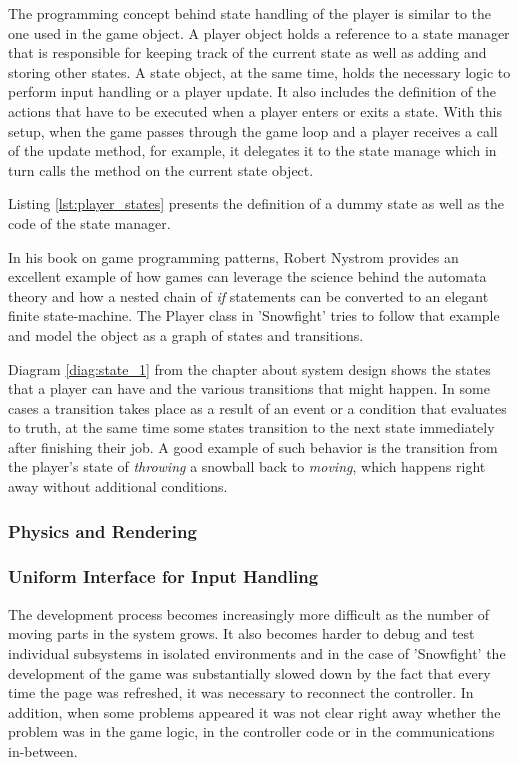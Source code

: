 The programming concept behind state handling of the player is similar to the
one used in the game object. A player object holds a reference to a state
manager that is responsible for keeping track of the current state as well as
adding and storing other states. A state object, at the same time, holds the
necessary logic to perform input handling or a player update. It also includes
the definition of the actions that have to be executed when a player enters or
exits a state. With this setup, when the game passes through the game loop and
a player receives a call of the update method, for example, it delegates it to
the state manage which in turn calls the method on the current state object.

Listing \ref{lst:player_states} presents the definition of a
dummy state as well as the code of the state manager.



In his book on game programming patterns\cite{game_patterns}, Robert Nystrom
provides an excellent example of how games can leverage the science behind the
automata theory and how a nested chain of \emph{if} statements can be converted
to an elegant finite state-machine. The Player class in 'Snowfight' tries to
follow that example and model the object as a graph of states and transitions.

Diagram \ref{diag:state_1} from the chapter about system design shows the states
that a player can have and the various transitions that might happen. In some
cases a transition takes place as a result of an event or a condition that
evaluates to truth, at the same time some states transition to the next state
immediately after finishing their job. A good example of such behavior is the
transition from the player's state of \emph{throwing} a snowball back to
\emph{moving}, which happens right away without additional conditions.

\subsubsection{Physics and Rendering}

\subsubsection{Uniform Interface for Input Handling}

The development process becomes increasingly more difficult as the number of
moving parts in the system grows. It also becomes harder to debug and test
individual subsystems in isolated environments and in the case of 'Snowfight'
the development of the game was substantially slowed down by the fact that every
time the page was refreshed, it was necessary to reconnect the controller. In
addition, when some problems appeared it was not clear right away whether the
problem was in the game logic, in the controller code or in the communications
in-between.

